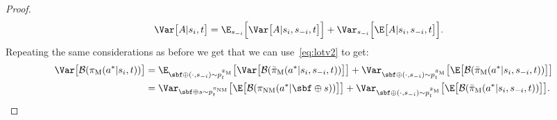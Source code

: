 \begin{proof}
    \begin{align}
		\Var \big[ A | s_i, t \big]
		&= \E_{s_{-i}} \Big[ \Var \big[ A | s_i, s_{-i}, t \big] \Big] + \Var_{s_{-i}} \Big[ \E\big[ A | s_i, s_{-i}, t \big] \Big].  \nonumber 
	\end{align}
    Repeating the same considerations as before we get that we can use~\eqref{eq:lotv2} to get:
    \begin{align*}
		\Var \big[ \mathcal{B} ( \pi_{\text{M}} (a^*|s_i, t) ) \big] &= \E_{\sbf \oplus(\cdot, s_{-i}) \sim p^{ \bar \pi_{\text{M}}}_t} \big[ \Var \big[ \mathcal{B} ( \bar \pi_{\text{M}} (a^* | s_i, s_{-i}, t) ) \big] \big] + \Var_{\sbf \oplus(\cdot, s_{-i}) \sim p^{\bar \pi_{\text{M}}}_t} \big[ \E \big[ \mathcal{B} ( \bar \pi_{\text{M}} (a^* |  s_i, s_{-i}, t) ) \big] \big]\\
        &=\Var_{\sbf  \oplus s \sim p^{\pi_{\text{NM}}}_t} \big[ \E \big[ \mathcal{B} ( \pi_{\text{NM}} (a^* | \sbf  \oplus s) ) \big] \big] + \Var_{\sbf \oplus(\cdot, s_{-i}) \sim p^{\bar \pi_{\text{M}}}_t} \big[ \E \big[ \mathcal{B} ( \bar \pi_{\text{M}} (a^* |  s_i, s_{-i}, t) ) \big] \big].
	\end{align*}
\end{proof}





